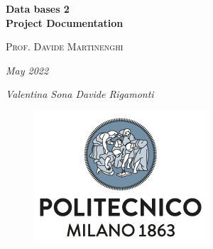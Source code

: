

\begin{titlepage}
    \centering
    \vspace*{6em}
    
    {\Huge\bfseries Data bases 2 \\ Project Documentation \par}
    
    \vspace{4em}
    
    {\large\scshape Prof. Davide Martinenghi \par} 
    
    \vspace{3em}
    
    {\large\slshape May 2022 \par}
    
    \vspace{3em}
    
    {
        \large\itshape 
        Valentina Sona
        \hspace{2em}
        Davide Rigamonti
        \par
    }
    
    \vfill
    
    \begin{figure}[b]
        \includegraphics[scale=0.6]{img/polimi.png} 
        \centering
    \end{figure}
\end{titlepage}

